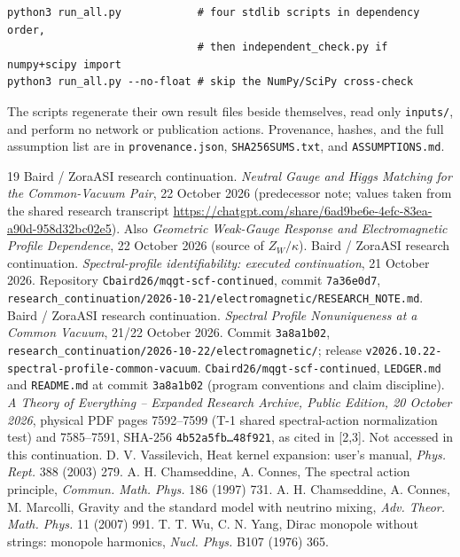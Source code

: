 \documentclass[11pt,letterpaper]{article}
\begin{document}
\begin{verbatim}
python3 run_all.py            # four stdlib scripts in dependency order,
                              # then independent_check.py if numpy+scipy import
python3 run_all.py --no-float # skip the NumPy/SciPy cross-check
\end{verbatim}
The scripts regenerate their own result files beside themselves, read only \texttt{inputs/}, and perform no network or publication actions. Provenance, hashes, and the full assumption list are in \texttt{provenance.json}, \texttt{SHA256SUMS.txt}, and \texttt{ASSUMPTIONS.md}.

{\small
\begin{thebibliography}{19}
 Baird / ZoraASI research continuation. \emph{Neutral Gauge and Higgs Matching for the Common-Vacuum Pair}, 22 October 2026 (predecessor note; values taken from the shared research transcript \url{https://chatgpt.com/share/6ad9be6e-4efc-83ea-a90d-958d32bc02e5}). Also \emph{Geometric Weak-Gauge Response and Electromagnetic Profile Dependence}, 22 October 2026 (source of $Z_W/\kappa$).
 Baird / ZoraASI research continuation. \emph{Spectral-profile identifiability: executed continuation}, 21 October 2026. Repository \texttt{Cbaird26/mqgt-scf-continued}, commit \texttt{7a36e0d7}, \texttt{research\_continuation/2026-10-21/electromagnetic/RESEARCH\_NOTE.md}.
 Baird / ZoraASI research continuation. \emph{Spectral Profile Nonuniqueness at a Common Vacuum}, 21/22 October 2026. Commit \texttt{3a8a1b02}, \texttt{research\_continuation/2026-10-22/electromagnetic/}; release \texttt{v2026.10.22-spectral-profile-common-vacuum}.
 \texttt{Cbaird26/mqgt-scf-continued}, \texttt{LEDGER.md} and \texttt{README.md} at commit \texttt{3a8a1b02} (program conventions and claim discipline).
 \emph{A Theory of Everything -- Expanded Research Archive, Public Edition, 20 October 2026}, physical PDF pages 7592--7599 (T-1 shared spectral-action normalization test) and 7585--7591, SHA-256 \texttt{4b52a5fb\ldots48f921}, as cited in [2,3]. Not accessed in this continuation.
 D. V. Vassilevich, Heat kernel expansion: user's manual, \emph{Phys. Rept.} 388 (2003) 279.
 A. H. Chamseddine, A. Connes, The spectral action principle, \emph{Commun. Math. Phys.} 186 (1997) 731.
 A. H. Chamseddine, A. Connes, M. Marcolli, Gravity and the standard model with neutrino mixing, \emph{Adv. Theor. Math. Phys.} 11 (2007) 991.
 T. T. Wu, C. N. Yang, Dirac monopole without strings: monopole harmonics, \emph{Nucl. Phys.} B107 (1976) 365.

\end{thebibliography}}
\end{document}
